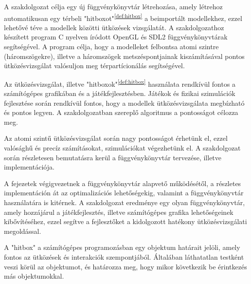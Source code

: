 
A szakdolgozat célja egy új függvénykönyvtár létrehozása, amely létrehoz automatikusan egy térbeli "hitboxot"\textsuperscript{\ref{def:hitbox}} a beimportált modellekhez, ezzel lehetővé téve a modellek közötti ütközések vizsgálatát. A szakdolgozathoz készített program C \cite{C} nyelven íródott OpenGL \cite{OpenGL} és SDL2 \cite{SDL2} függvénykönyvtárak segítségével. A program célja, hogy a modelleket felbontsa atomi szintre (háromszögekre), illetve a háromszögek metszéspontjainak kiszámításával pontos ütközésvizsgálat valósuljon meg térpartícionálás \cite{ter} segítségével.

Az ütközésvizsgálat, illetve "hitboxok"\textsuperscript{\ref{def:hitbox}} használata rendkívül fontos a számítógépes grafikában és a játékfejlesztésben. Játékok és fizikai szimulációk fejlesztése során rendkívül fontos, hogy a modellek ütközésvizsgálata megbízható és pontos legyen. A szakdolgozatban szereplő algoritmus a pontosságot célozza meg.

Az atomi szintű ütközésvizsgálat során nagy pontosságot érhetünk el, ezzel valósághű és precíz számításokat, szimulációkat végezhetünk el. A szakdolgozat során részletesen bemutatásra kerül a függvénykönyvtár tervezése, illetve implementációja.

A fejezetek végigvezetnek a függvénykönyvtár alapvető működésétől, a részletes implementáción át az optimalizációs lehetőségekig, valamint a függvénykönyvtár használatára is kitérnek. A szakdolgozat eredménye egy olyan függvénykönyvtár, amely hozzájárul a játékfejlesztés, illetve számítógépes grafika lehetőségeinek kibővítéséhez, ezzel segítve a fejlesztőket a kidolgozott hatékony ütközésvizsgálati megoldással.
\vfill
\begin{definition}[Hitbox]
	A "hitbox" a számítógépes programozásban egy objektum határait jelöli, amely fontos az ütközések és interakciók szempontjából. Általában láthatatlan testként veszi körül az objektumot, és határozza meg, hogy mikor következik be érintkezés más objektumokkal. 
	\label{def:hitbox}
\end{definition}
